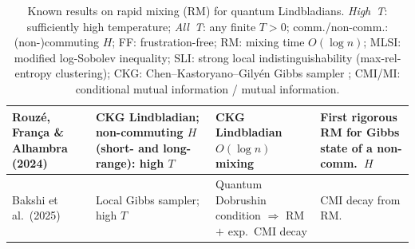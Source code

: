 \documentclass[11pt]{article}
\numberwithin{equation}{section}
\numberwithin{figure}{section}
\numberwithin{table}{section}
\theoremstyle{definition}
\theoremstyle{plain}
\theoremstyle{remark}
\newcommand{\alv}[1]{{\color{red}#1}}
\begin{document}
\begin{table}[h!]
\begin{tabular}{@{}|p{2.8cm}|p{3.8cm}|p{4.0cm}|p{2.2cm}|@{}}
 
\hline



Rouzé, Fran\c{c}a \& Alhambra (2024) \cite{rouze_optimal_2024}
  & CKG Lindbladian;
    non-commuting $H$ (short- and long-range):
    high $T$
  & CKG Lindbladian $O(\log n)$ mixing
  & First rigorous RM
    for Gibbs state of a non-comm.\ $H$ \\

\hline

Bakshi et al.\ (2025) \cite{bakshi_dobrushin_2025}
  & Local Gibbs sampler; high $T$
  & Quantum Dobrushin condition
    $\Rightarrow$ RM $+$ exp.\ CMI decay
  & CMI decay from RM. \\




\bottomrule
\end{tabular}
\caption{Known results on rapid mixing (RM) for quantum Lindbladians.
  \emph{High~T}: sufficiently high temperature;
  \emph{All~T}: any finite $T>0$;
  comm./non-comm.: (non-)commuting $H$;
  FF: frustration-free;
  RM: mixing time $O(\log n)$;
  MLSI: modified log-Sobolev inequality;
  SLI: strong local indistinguishability (max-rel-entropy clustering);
  CKG: Chen--Kastoryano--Gilyén Gibbs sampler \cite{chen_efficient_2023};
  CMI/MI: conditional mutual information / mutual information.}
\label{tab:rapid_mixing_literature}
\end{table}
\end{document}
